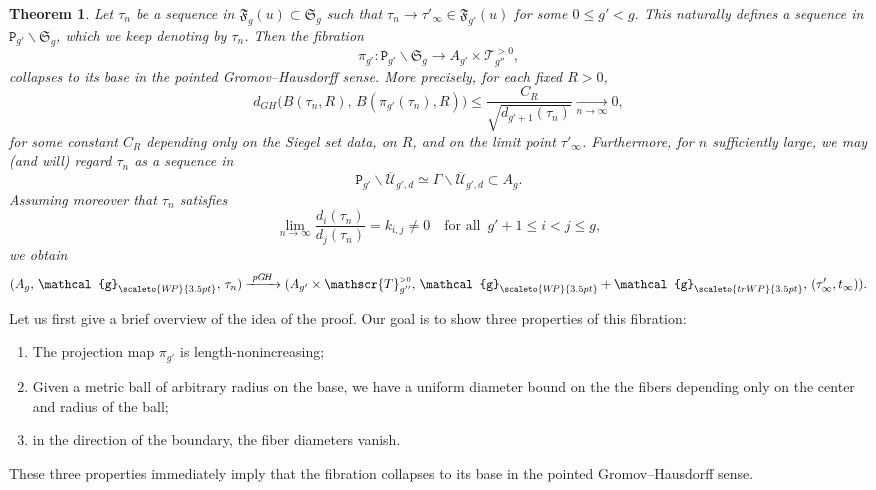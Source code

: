 \documentclass[11pt]{amsart}
\theoremstyle{plain}
\newtheorem{theorem}{Theorem}[section]
\theoremstyle{definition}
\theoremstyle{remark}
\newcommand{\fS}{\mathfrak{S}}
\newcommand{\g}{\mathcal{g}}
\newcommand{\tP}{\mathtt{P}}
\newcommand{\fF}{\mathfrak{F}}
\newcommand{\WP}{\scaleto{W\!P}{3.5pt}}
\newcommand{\trWP}{\scaleto{trWP}{3.5pt}}
\newcommand{\cT}[1]{\mathscr{T}_{#1}^{\scriptscriptstyle{>0}}}
\begin{document}
\begin{theorem}
\label{thm:main.second.version}
    Let $\tau_n$ be a sequence in $\fF_g(u)\subset\fS_g$ such that
    $\tau_n\to \tau'_\infty\in\fF_{g'}(u)$ for some $0\leq g' <g$.
    This naturally defines a sequence in $\tP_{g'}\backslash \fS_g$, which we keep denoting by $\tau_n$.
    Then the fibration
    \[
        \pi_{g'}: \tP_{g'}\backslash\fS_g \longrightarrow A_{g'}\times\cT{g''},
    \]
    collapses to its base in the pointed Gromov--Hausdorff sense. More precisely, for each fixed $R>0$,
    \begin{equation}
        \label{eq:GH.dis.balls.R}
        d_{GH}\Big(B(\tau_n,R),\, B(\pi_{g'}(\tau_n),R)\Big)
        \le \frac{C_R}{\sqrt{d_{g'+1}(\tau_n)}} \xrightarrow[n\to\infty]{} 0,
    \end{equation}
    for some constant $C_R$ depending only on the Siegel set data, on $R$, and on the limit point $\tau'_\infty$.
    Furthermore, for $n$ sufficiently large, we may (and will) regard $\tau_n$ as a sequence in
    \[
    \tP_{g'}\backslash\overline{\mathcal{U}}_{g'\!,d}\simeq
    \Gamma\backslash\overline{\mathcal{U}}_{g'\!,d}\subset A_g.
    \]
    Assuming moreover that $\tau_n$ satisfies
    \begin{equation}
    \label{eq:lim.didj}
        \lim_{n\to \infty}\frac{d_i(\tau_n)}{d_j(\tau_n)}=k_{i,j}\neq 0
        \quad \text{for all }\,g'+1\leq i<j\leq g,
    \end{equation}
    we obtain
    \begin{equation}\label{eq:pGH.conve.Ag}
        (A_g,\,\g_{\WP},\,\tau_n)\xrightarrow[]{\,\,pG\!H\,\,}
        (A_{g'}\times\cT{g''},\,\g_{\WP} + \g_{\trWP}, \,(\tau'_\infty,t_\infty)).
    \end{equation}
\end{theorem}


Let us first give a brief overview of the idea of the proof. Our goal is to show three properties of this fibration:
\begin{enumerate}[label=(\roman*)]
\item The projection map $\pi_{g'}$ is length-nonincreasing;
\item Given a metric ball of arbitrary radius on the base, we have a uniform diameter bound on the the fibers depending only on the center and radius of the ball;
\item in the direction of the boundary, the fiber diameters vanish.
\end{enumerate}
These three properties immediately imply that the fibration collapses to its base in 
the pointed Gromov--Hausdorff sense.
\end{document}

